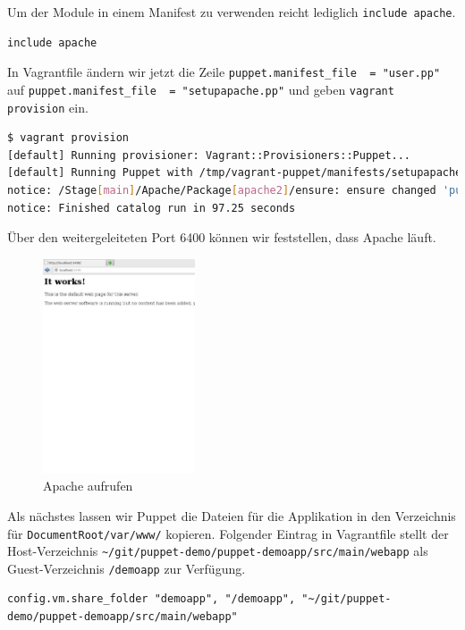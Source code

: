 \documentclass[12pt,a4paper,ngerman]{article}
\begin{document}
Um der Module in einem Manifest zu verwenden reicht lediglich \lstinline$include apache$.
\begin{lstlisting}[language=puppet,caption=Inhalt von manifests/setupapache.pp, label=setupapache.pp]
include apache
\end{lstlisting}

In Vagrantfile ändern wir jetzt die Zeile \lstinline$puppet.manifest_file  = "user.pp"$ auf \lstinline$puppet.manifest_file  = "setupapache.pp"$ und geben \lstinline$vagrant provision$ ein.

\begin{lstlisting}[language=sh,caption=vagrant provisioning für Apache, label=provisioning_apache]
$ vagrant provision
[default] Running provisioner: Vagrant::Provisioners::Puppet...
[default] Running Puppet with /tmp/vagrant-puppet/manifests/setupapache.pp...
notice: /Stage[main]/Apache/Package[apache2]/ensure: ensure changed 'purged' to 'present'
notice: Finished catalog run in 97.25 seconds
\end{lstlisting}

Über den weitergeleiteten Port 6400 können wir feststellen, dass Apache läuft.
\begin{figure}
  \begin{center}
    \includegraphics[width=0.4\textwidth]{images/apache.pdf}
  \end{center}
  \caption{Apache aufrufen}
  \label{apache}
\end{figure}

Als nächstes lassen wir Puppet die Dateien für die Applikation in den Verzeichnis für \lstinline$DocumentRoot/var/www/$ kopieren. Folgender Eintrag in Vagrantfile stellt der Host-Verzeichnis \lstinline$~/git/puppet-demo/puppet-demoapp/src/main/webapp$ als Guest-Verzeichnis \lstinline$/demoapp$ zur Verfügung.
\begin{lstlisting}[language=vagrant,caption=Shared folders in Vagrantfile konfigurieren, label=vagrantsharedfolder]
config.vm.share_folder "demoapp", "/demoapp", "~/git/puppet-demo/puppet-demoapp/src/main/webapp"
\end{lstlisting}
\end{document}
